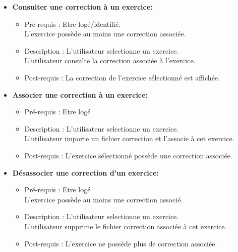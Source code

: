 \begin{itemize}
\item {\bf Consulter une correction {\`a} un exercice:}
	\begin{itemize}
	\item Pr{\'e}-requis : Etre log{\'e}/identifi{\'e}.\\
	L'exercice poss{\`e}de au moins une correction associ{\'e}e.
	\item Description :  L'utilisateur selectionne un exercice.\\
	L'utilisateur consulte la correction associ{\'e}e {\`a} l'exercice.
	\item Post-requis : La correction de l'exercice s{\'e}lectionn{\'e} est affich{\'e}e.
	\end{itemize}

\item {\bf Associer une correction {\`a} un exercice:}
	\begin{itemize}
	\item Pr{\'e}-requis : Etre log{\'e}
	\item Description :  L'utilisateur selectionne un exercice.\\
	L'utilisateur importe un fichier correction et l'associe {\`a} cet exercice.
	\item Post-requis : L'exercice s{\'e}lectionn{\'e} poss{\`e}de une correction associ{\'e}e.
	\end{itemize}

\item {\bf D{\'e}sassocier une correction d'un exercice:}
	\begin{itemize}
	\item Pr{\'e}-requis : Etre log{\'e}\\
	L'exercice poss{\`e}de au moins une correction associ{\'e}.
	\item Description : L'utilisateur selectionne un exercice.\\
	L'utilisateur supprime le fichier correction associ{\'e}e {\`a} cet exercice.
	\item Post-requis : L'exercice ne poss{\`e}de plus de correction associ{\'e}e.\\
	\end{itemize}
			
\end{itemize}